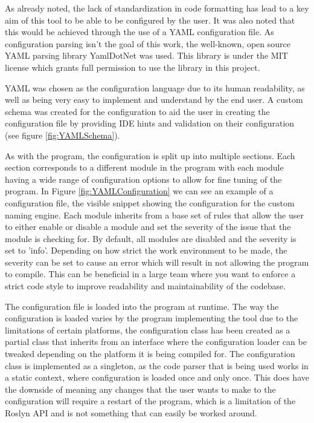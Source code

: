 As already noted, the lack of standardization in code formatting has lead to a key aim of this tool to be able to be configured by the user. It was also noted that this would be achieved through the use of a YAML configuration file. As configuration parsing isn't the goal of this work, the well-known, open source YAML parsing library YamlDotNet was used. This library is under the MIT license which grants full permission to use the library in this project.

YAML was chosen as the configuration language due to its human readability, as well as being very easy to implement and understand by the end user. A custom schema was created for the configuration to aid the user in creating the configuration file by providing IDE hints and validation on their configuration (see figure \ref{fig:YAMLSchema}).

As with the program, the configuration is split up into multiple sections. Each section corresponds to a different module in the program with each module having a wide range of configuration options to allow for fine tuning of the program. In Figure \ref{fig:YAMLConfiguration} we can see an example of a configuration file, the visible snippet showing the configuration for the custom naming engine. Each module inherits from a base set of rules that allow the user to either enable or disable a module and set the severity of the issue that the module is checking for. By default, all modules are disabled and the severity is set to 'info'. Depending on how strict the work environment to be made, the severity can be set to cause an error which will result in not allowing the program to compile. This can be beneficial in a large team where you want to enforce a strict code style to improve readability and maintainability of the codebase.

The configuration file is loaded into the program at runtime. The way the configuration is loaded varies by the program implementing the tool due to the limitations of certain platforms, the configuration class has been created as a partial class that inherits from an interface where the configuration loader can be tweaked depending on the platform it is being compiled for. The configuration class is implemented as a singleton, as the code parser that is being used works in a static context, where configuration is loaded once and only once. This does have the downside of meaning any changes that the user wants to make to the configuration will require a restart of the program, which is a limitation of the Roslyn API and is not something that can easily be worked around.

